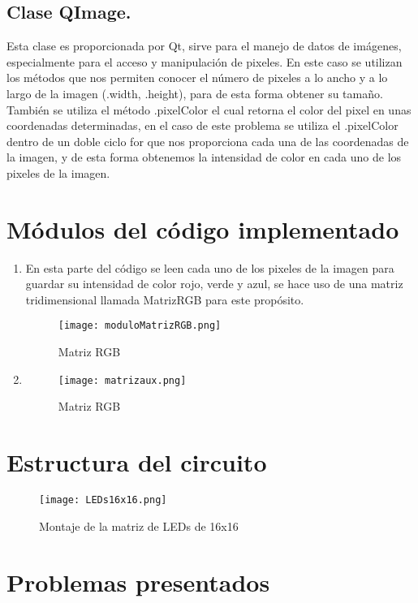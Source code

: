 \documentclass{article}
\begin{document}
\subsection{Clase QImage.}
Esta clase es proporcionada por Qt, sirve para el manejo de datos de imágenes, especialmente para el acceso y manipulación de pixeles. En este caso se utilizan los métodos que nos permiten conocer el número de pixeles a lo ancho y a lo largo de la imagen (.width, .height), para de esta forma obtener su tamaño. También se utiliza el método .pixelColor el cual retorna el color del pixel en unas coordenadas determinadas, en el caso de este problema se utiliza el .pixelColor dentro de un doble ciclo for que nos proporciona cada una de las coordenadas de la imagen, y de esta forma obtenemos la intensidad de color en cada uno de los pixeles de la imagen.



\section{Módulos del código implementado} \label{Modulos}
\begin{enumerate}
\item En esta parte del código se leen cada uno de los pixeles de la imagen para guardar su intensidad de color rojo, verde y azul, se hace uso de una matriz tridimensional llamada MatrizRGB para este propósito.

\begin{figure}[h]
\texttt{[image: moduloMatrizRGB.png]}
\centering
\caption{Matriz RGB}
\label{fig:matrizRGB}
\end{figure}

\item
\begin{figure}[h]
\texttt{[image: matrizaux.png]}
\centering
\caption{Matriz RGB}
\label{fig:matrizaux}
\end{figure}


\end{enumerate}

\section{Estructura del circuito} \label{circuito}

\begin{figure}[h]
\texttt{[image: LEDs16x16.png]}
\centering
\caption{Montaje de la matriz de LEDs de 16x16}
\label{fig:punto1}
\end{figure}


\section{Problemas presentados} \label{problemas}
\end{document}
